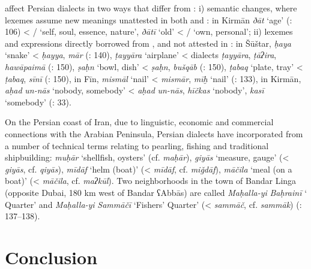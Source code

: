 \documentclass[output=paper]{langsci/langscibook}
\begin{document}
  affect Persian dialects in two ways that differ from : i) semantic changes, where  lexemes assume new meanings unattested in both  and : in Kirmān \textit{ðāt} ‘age’   (\citealt{Ṣarrāfī1996}: 106) < / ‘self, soul, essence, nature’, \textit{ðātī} ‘old’ < / ‘own, personal’; ii) lexemes and expressions directly borrowed from , and not attested in : in Šūštar, \textit{ḥaya} ‘snake’ <  \textit{ḥayya},  \textit{mār} (\citealt{Fāẓilī2004}: 140), \textit{ṭayyāra} ‘airplane’ <  dialects \textit{ṭayyāra},  \textit{ṭāʔira},  \textit{hawāpaimā} (\citealt{Fāẓilī2004}: 150), \textit{ṣaḥn} ‘bowl, dish’ <  \textit{ṣaḥn},  \textit{bušqāb} (\citealt{Fāẓilī2004}: 150), \textit{ṭabaq} ‘plate, tray’ <  \textit{ṭabaq},  \textit{sīnī} (\citealt{Fāẓilī2004}: 150), in Fīn, \textit{mismāl} ‘nail’ <  \textit{mismār},  \textit{mīḫ} ‘nail’ (\citealt{NaǧībiFīni2002}: 133), in Kirmān, \textit{aḥad} \textit{un-nās} ‘nobody, somebody’ <  \textit{aḥad} \textit{un-nās},  \textit{hīčkas} ‘nobody’, \textit{kasī} ‘somebody’ (\citealt{Ṣarrāfī1996}: 33).

On the Persian  coast of Iran, due to linguistic, economic and commercial connections with the Arabian Peninsula, Persian dialects have incorporated from   a number of  technical terms relating to pearling, fishing and traditional shipbuilding: \textit{muḥār} ‘shellfish, oysters’ (cf.  \textit{maḥār}), \textit{giyās} ‘measure, gauge’ (<  \textit{giyās}, cf.  \textit{qiyās}), \textit{mīdāf} ‘helm (boat)’ (<  \textit{mīdāf}, cf.  \textit{miǧdāf}), \textit{māčila} ‘meal (on a boat)’ (<  \textit{māčila}, cf.  \textit{maʔkūl}). Two neighborhoods in the town of Bandar Linga (opposite Dubai, 180 km west of Bandar ʕAbbās) are called \textit{Maḥalla-yi} \textit{Baḥrainī} ‘ Quarter’ and \textit{Maḥalla-yi} \textit{Sammāčī} ‘Fishers’ Quarter’ (<  \textit{sammāč}, cf.  \textit{sammāk}) (\citealt{Baḫtiyārī1990}: 137–138).

\section{Conclusion}
\end{document}

